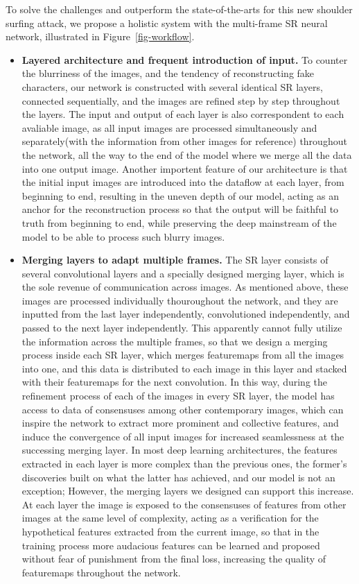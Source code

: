 To solve the challenges and outperform the state-of-the-arts for this new shoulder surfing attack, we propose a holistic system with the multi-frame SR neural network, illustrated in Figure~\ref{fig-workflow}.
\begin{itemize}[leftmargin=*]
  \item \textbf{Layered architecture and frequent introduction of input.} To counter the blurriness of the images, and the tendency of reconstructing fake characters, our network is constructed with several identical SR layers, connected sequentially, and the images are refined step by step throughout the layers. The input and output of each layer is also correspondent to each avaliable image, as all input images are processed simultaneously and separately(with the information from other images for reference) throughout the network, all the way to the end of the model where we merge all the data into one output image. Another importent feature of our architecture is that the initial input images are introduced into the dataflow at each layer, from beginning to end, resulting in the uneven depth of our model, acting as an anchor for the reconstruction process so that the output will be faithful to truth from beginning to end, while preserving the deep mainstream of the model to be able to process such blurry images.
  \item \textbf{Merging layers to adapt multiple frames.} The SR layer consists of several convolutional layers and a specially designed merging layer, which is the sole revenue of communication across images. As mentioned above, these images are processed individually thouroughout the network, and they are inputted from the last layer independently, convolutioned independently, and passed to the next layer independently. This apparently cannot fully utilize the information across the multiple frames, so that we design a merging process inside each SR layer, which merges featuremaps from all the images into one, and this data is distributed to each image in this layer and stacked with their featuremaps for the next convolution. In this way, during the refinement process of each of the images in every SR layer, the model has access to data of consensuses among other contemporary images, which can inspire the network to extract more prominent and collective features, and induce the convergence of all input images for increased seamlessness at the successing merging layer. In most deep learning architectures, the features extracted in each layer is more complex than the previous ones, the former's discoveries built on what the latter has achieved, and our model is not an exception; However, the merging layers we designed can support this increase. At each layer the image is exposed to the consensuses of features from other images at the same level of complexity, acting as a verification for the hypothetical features extracted from the current image, so that in the training process more audacious features can be learned and proposed without fear of punishment from the final loss, increasing the quality of featuremaps throughout the network.

\end{itemize}
